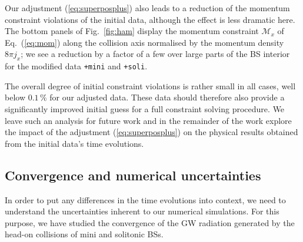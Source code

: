 \documentclass[11pt]{report}  %
\begin{document}
Our adjustment (\ref{eq:superposplus}) also leads to
a reduction of the momentum constraint violations of the
initial data, although the effect is less dramatic here.
The bottom panels of Fig.~\ref{fig:ham} display the
momentum constraint $\mathcal{M}_x$ of Eq.~(\ref{eq:mom})
along the collision axis normalised by the momentum
density $8\pi j_x$; we see a reduction by a factor of a few
over large parts of the BS interior for the modified
data {\tt +mini} and {\tt +soli}.

The overall degree of initial constraint violations is
rather small in all cases, well below $0.1\,\%$ for
our adjusted data. These data should therefore also
provide a significantly improved initial guess for
a full constraint solving procedure. We leave such an
analysis for future work and in the remainder of the
work explore the impact of the adjustment
(\ref{eq:superposplus}) on the physical results
obtained from the initial data's time evolutions.

\subsection{Convergence and numerical uncertainties}
%
In order to put any differences in the time evolutions
into context, we need to understand the uncertainties
inherent to our numerical simulations. For this purpose,
we have studied the convergence of the GW radiation
generated by the head-on collisions of mini and solitonic
BSs.
\end{document}
